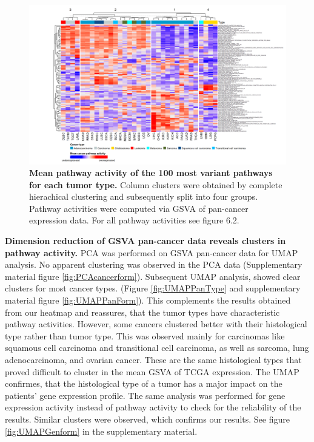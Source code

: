 \documentclass[
  11pt,
  parskip,
  oneside]{scrreprt}
\begin{document}
\begin{figure}

{\centering \includegraphics[width=0.87\linewidth]{figures/Pan Cancer mean expression top 100 pathways} 

}

\caption{\textbf{Mean pathway activity of the 100 most variant pathways for each tumor type.} Column clusters were obtained by complete hierachical clustering and subsequently split into four groups. Pathway activities were computed via GSVA of pan-cancer expression data. For all pathway activities see figure 6.2.}\label{fig:meanexp}
\end{figure}

\textbf{Dimension reduction of GSVA pan-cancer data reveals clusters in
pathway activity.} PCA was performed on GSVA pan-cancer data for UMAP
analysis. No apparent clustering was observed in the PCA data
(Supplementary material figure \ref{fig:PCAcancerform}). Subsequent UMAP
analysis, showed clear clusters for most cancer types. (Figure
\ref{fig:UMAPPanType} and supplementary material figure
\ref{fig:UMAPPanForm}). This complements the results obtained from our
heatmap and reassures, that the tumor types have characteristic pathway
activities. However, some cancers clustered better with their
histological type rather than tumor type. This was observed mainly for
carcinomas like squamous cell carcinoma and transitional cell carcinoma,
as well as sarcoma, lung adenocarcinoma, and ovarian cancer. These are
the same histological types that proved difficult to cluster in the mean
GSVA of TCGA expression. The UMAP confirmes, that the histological type
of a tumor has a major impact on the patients' gene expression profile.
The same analysis was performed for gene expression activity instead of
pathway activity to check for the reliability of the results. Similar
clusters were observed, which confirms our results. See figure
\ref{fig:UMAPGenform} in the supplementary material.
\end{document}

